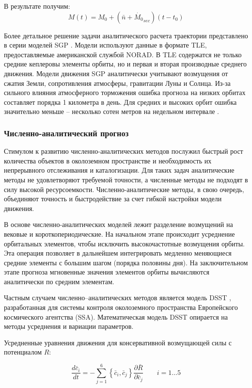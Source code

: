 В результате получим:
\begin{equation*}
    M(t) = M_0 + (\bar{n} + \dot{M_0}_{sec}) (t - t_0)
\end{equation*}

Более детальное решение задачи аналитического расчета траектории представлено в серии моделей SGP \cite{spacetrack80}.
Модели используют данные в формате TLE, предоставляемые американской службой NORAD. 
В TLE содержатся не только средние кеплеровы элементы орбиты, но и первая и вторая производные среднего движения.
Модели движения SGP аналитически учитывают возмущения от сжатия Земли, сопротивления атмосферы, гравитации Луны и Солнца.
Из-за сильного влияния атмосферного торможения ошибка прогноза на низких орбитах составляет порядка 1 километра в день.
Для средних и высоких орбит ошибка значительно меньше -- несколько сотен метров на недельном интервале \cite{vallado2008}. 

\subsubsection{Численно-аналитический прогноз}
Стимулом к развитию численно-аналитических методов послужил быстрый рост количества
объектов в околоземном пространстве и необходимость их непрерывного отслеживания и каталогизации.
Для таких задач аналитические методы не удовлетворяют требуемой точности, а численные методы
не подходят в силу высокой ресурсоемкости. Численно-аналитические методы, в свою очередь,
объединяют точность и быстродействие за счет гибкой настройки модели движения.

В основе численно-аналитических моделей лежит разделение возмущений на вековые и короткопериодические.
На начальном этапе происходит усреднение орбитальных элементов, 
чтобы исключить высокочастотные возмущения орбиты. Эта операция позволяет в дальнейшем
интегрировать медленно меняющиеся средние элементы с большим шагом (порядка половины дня).
На заключительном этапе прогноза мгновенные значения элементов орбиты вычисляются аналитически по средним элементам.

Частным случаем численно--аналитических методов является модель DSST \cite{danielson1995}, разработанная для
системы контроля околоземного пространства Европейского космического агентства (SSA).
Математическая модель DSST опирается на методы усреднения и вариации параметров.

Усредненные уравнения движения для консервативной возмущающей силы с потенциалом $R$:

\begin{equation*}
    \frac{d\bar{c}_i}{dt} = -\sum_{j=1}^{6} \left\{\bar{c}_i, \bar{c}_j \right\} 
                                \frac{\partial \bar{R}}{\partial\bar{c}_j} \qquad i=1 \dots 5
\end{equation*}

